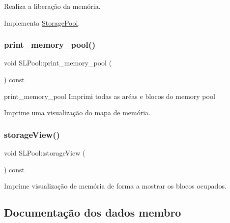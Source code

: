 Realiza a liberação da memória. 



Implementa \hyperlink{classStoragePool_a2120a75c4562735372d089685828b8df}{Storage\+Pool}.

\mbox{\label{classSLPool_a74c29c43b2e158ce4b50bd908e8b5fed}} 
\subsubsection{\texorpdfstring{print\+\_\+memory\+\_\+pool()}{print\_memory\_pool()}}
{\footnotesize\ttfamily void S\+L\+Pool\+::print\+\_\+memory\+\_\+pool (\begin{DoxyParamCaption}{ }\end{DoxyParamCaption}) const}



print\+\_\+memory\+\_\+pool Imprimi todas as aréas e blocos do memory pool 

Imprime uma visualização do mapa de memória. \mbox{\label{classSLPool_a568540fc5f7e849c94ae430106d9d285}} 
\subsubsection{\texorpdfstring{storage\+View()}{storageView()}}
{\footnotesize\ttfamily void S\+L\+Pool\+::storage\+View (\begin{DoxyParamCaption}{ }\end{DoxyParamCaption}) const}



Imprime visualização de memória de forma a mostrar os blocos ocupados. 



\subsection{Documentação dos dados membro}
\mbox{\label{classSLPool_a581aba69cb859a6a59a1d87cf14cbf85}} 
